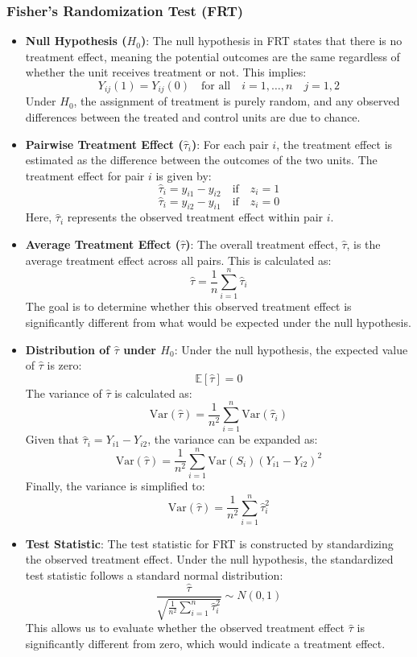 \subsubsection{Fisher's Randomization Test (FRT)}

\begin{itemize}
    
    \item \textbf{Null Hypothesis ($H_0$)}: The null hypothesis in FRT states that there is no treatment effect, meaning the potential outcomes are the same regardless of whether the unit receives treatment or not. This implies:
    \[
    Y_{ij}(1) = Y_{ij}(0) \quad \text{for all} \quad i = 1, \dots, n \quad j = 1, 2
    \]
    Under $H_0$, the assignment of treatment is purely random, and any observed differences between the treated and control units are due to chance.
    
    \item \textbf{Pairwise Treatment Effect ($\hat{\tau}_i$)}: For each pair $i$, the treatment effect is estimated as the difference between the outcomes of the two units. The treatment effect for pair $i$ is given by:
    \[
    \hat{\tau}_i = y_{i1} - y_{i2} \quad \text{if} \quad z_i = 1
    \]
    \[
    \hat{\tau}_i = y_{i2} - y_{i1} \quad \text{if} \quad z_i = 0
    \]
    Here, $\hat{\tau}_i$ represents the observed treatment effect within pair $i$.
    
    \item \textbf{Average Treatment Effect ($\hat{\tau}$)}: The overall treatment effect, $\hat{\tau}$, is the average treatment effect across all pairs. This is calculated as:
    \[
    \hat{\tau} = \frac{1}{n} \sum_{i=1}^{n} \hat{\tau}_i
    \]
    The goal is to determine whether this observed treatment effect is significantly different from what would be expected under the null hypothesis.
    
    \item \textbf{Distribution of $\hat{\tau}$ under $H_0$}: Under the null hypothesis, the expected value of $\hat{\tau}$ is zero:
    \[
    \mathbb{E}[\hat{\tau}] = 0
    \]
    The variance of $\hat{\tau}$ is calculated as:
    \[
    \text{Var}(\hat{\tau}) = \frac{1}{n^2} \sum_{i=1}^{n} \text{Var}(\hat{\tau}_i)
    \]
    Given that $\hat{\tau}_i = Y_{i1} - Y_{i2}$, the variance can be expanded as:
    \[
    \text{Var}(\hat{\tau}) = \frac{1}{n^2} \sum_{i=1}^{n} \text{Var}(S_i) \left( Y_{i1} - Y_{i2} \right)^2
    \]
    Finally, the variance is simplified to:
    \[
    \text{Var}(\hat{\tau}) = \frac{1}{n^2} \sum_{i=1}^{n} \hat{\tau}_i^2
    \]
    
    \item \textbf{Test Statistic}: The test statistic for FRT is constructed by standardizing the observed treatment effect. Under the null hypothesis, the standardized test statistic follows a standard normal distribution:
    \[
    \frac{\hat{\tau}}{\sqrt{\frac{1}{n^2} \sum_{i=1}^{n} \hat{\tau}_i^2}} \sim N(0, 1)
    \]
    This allows us to evaluate whether the observed treatment effect $\hat{\tau}$ is significantly different from zero, which would indicate a treatment effect.
    
\end{itemize}

